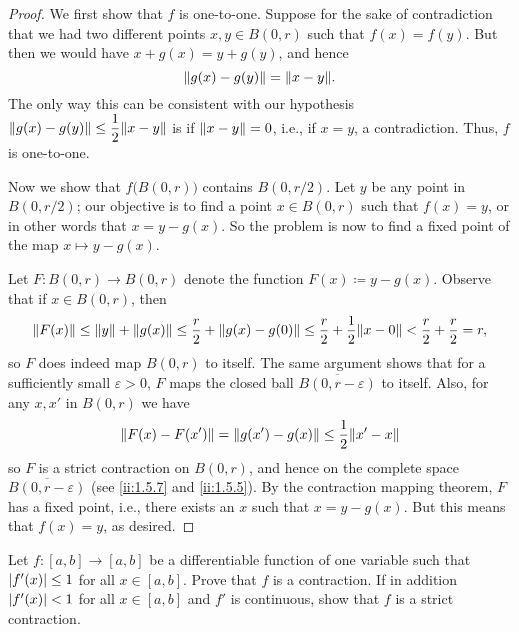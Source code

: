 \begin{proof}
  We first show that \(f\) is one-to-one.
  Suppose for the sake of contradiction that we had two different points \(x, y \in B(0, r)\) such that \(f(x) = f(y)\).
  But then we would have \(x + g(x) = y + g(y)\), and hence
  \[
    \norm*{g(x) - g(y)} = \norm*{x - y}.
  \]
  The only way this can be consistent with our hypothesis \(\norm*{g(x) - g(y)} \leq \dfrac{1}{2} \norm*{x - y}\) is if \(\norm*{x - y} = 0\), i.e., if \(x = y\), a contradiction.
  Thus, \(f\) is one-to-one.

  Now we show that \(f\big(B(0, r)\big)\) contains \(B(0, r / 2)\).
  Let \(y\) be any point in \(B(0, r / 2)\);
  our objective is to find a point \(x \in B(0, r)\) such that \(f(x) = y\), or in other words that \(x = y - g(x)\).
  So the problem is now to find a fixed point of the map \(x \mapsto y - g(x)\).

  Let \(F : B(0, r) \to B(0, r)\) denote the function \(F(x) \coloneqq y - g(x)\).
  Observe that if \(x \in B(0, r)\), then
  \[
    \norm*{F(x)} \leq \norm*{y} + \norm*{g(x)} \leq \dfrac{r}{2} + \norm*{g(x) - g(0)} \leq \dfrac{r}{2} + \dfrac{1}{2} \norm*{x - 0} < \dfrac{r}{2} + \dfrac{r}{2} = r,
  \]
  so \(F\) does indeed map \(B(0, r)\) to itself.
  The same argument shows that for a sufficiently small \(\varepsilon > 0\), \(F\) maps the closed ball \(\overline{B(0, r - \varepsilon)}\) to itself.
  Also, for any \(x, x'\) in \(B(0, r)\) we have
  \[
    \norm*{F(x) - F(x')} = \norm*{g(x') - g(x)} \leq \dfrac{1}{2} \norm*{x' - x}
  \]
  so \(F\) is a strict contraction on \(B(0, r)\), and hence on the complete space \(\overline{B(0, r - \varepsilon)}\) (see \cref{ii:1.5.7} and \cref{ii:1.5.5}).
  By the contraction mapping theorem, \(F\) has a fixed point, i.e., there exists an \(x\) such that \(x = y - g(x)\).
  But this means that \(f(x) = y\), as desired.
\end{proof}

\exercisesection

\begin{ex}\label{ii:ex:6.6.1}
  Let \(f : [a, b] \to [a, b]\) be a differentiable function of one variable such that \(\abs{f'(x)} \leq 1\) for all \(x \in [a, b]\).
  Prove that \(f\) is a contraction.
  If in addition \(\abs{f'(x)} < 1\) for all \(x \in [a, b]\) and \(f'\) is continuous, show that \(f\) is a strict contraction.
\end{ex}

